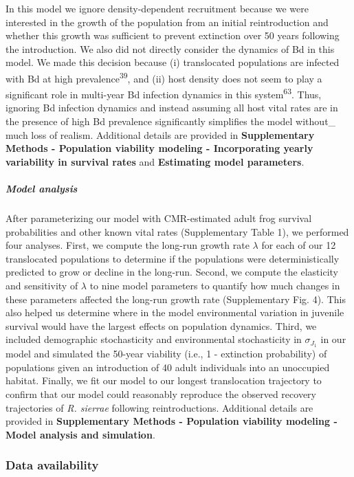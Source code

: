 \documentclass[
  letterpaper,
  DIV=11,
  numbers=noendperiod]{scrartcl}
\let\oldsubparagraph\subparagraph
\renewcommand{\subparagraph}[1]{\oldsubparagraph{#1}\mbox{}}
\begin{document}
In this model we ignore density-dependent recruitment because we were
interested in the growth of the population from an initial
reintroduction and whether this growth was sufficient to prevent
extinction over 50 years following the introduction. We also did not
directly consider the dynamics of Bd in this model. We made this
decision because (i) translocated populations are infected with Bd at
high prevalence\textsuperscript{39}, and (ii) host density does not seem
to play a significant role in multi-year Bd infection dynamics in this
system\textsuperscript{63}. Thus, ignoring Bd infection dynamics and
instead assuming all host vital rates are in the presence of high Bd
prevalence significantly simplifies the model without\_ much loss of
realism. Additional details are provided in \textbf{Supplementary
Methods - Population viability modeling - Incorporating yearly
variability in survival rates} and \textbf{Estimating model parameters}.

\subparagraph{Model analysis}\label{model-analysis}

After parameterizing our model with CMR-estimated adult frog survival
probabilities and other known vital rates (Supplementary Table 1), we
performed four analyses. First, we compute the long-run growth rate
\(\lambda\) for each of our 12 translocated populations to determine if
the populations were deterministically predicted to grow or decline in
the long-run. Second, we compute the elasticity and sensitivity of
\(\lambda\) to nine model parameters to quantify how much changes in
these parameters affected the long-run growth rate (Supplementary Fig.
4). This also helped us determine where in the model environmental
variation in juvenile survival would have the largest effects on
population dynamics. Third, we included demographic stochasticity and
environmental stochasticity in \(\sigma_{J_1}\) in our model and
simulated the 50-year viability (i.e., 1 - extinction probability) of
populations given an introduction of 40 adult individuals into an
unoccupied habitat. Finally, we fit our model to our longest
translocation trajectory to confirm that our model could reasonably
reproduce the observed recovery trajectories of \emph{R. sierrae}
following reintroductions. Additional details are provided in
\textbf{Supplementary Methods - Population viability modeling - Model
analysis and simulation}.

\subsubsection{Data availability}\label{data-availability}
\end{document}

